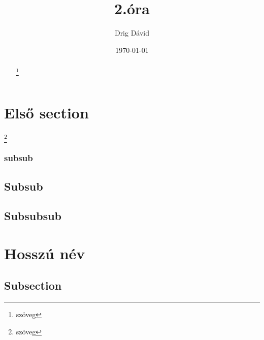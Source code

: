 \documentclass[12pt,twoside]{article}
\begin{document}
\pagestyle{fancy}
\setlength{\headheight}{52pt}


\renewcommand{\footrulewidth}{0.4pt}
\fancyhead[LE,RO]{\thepage}
\fancyhead[LO]{\leftmark}
\fancyhead[RE]{\rightmark}












\title{2.óra}
\author{Drig Dávid}
\date{\today}
\renewcommand{\thefootnote}{\fnsymbol{footnote}}
\maketitle



\begin{abstract}
\hulipsum[1]
\blindtext[1]
\footnote{szöveg}
\end{abstract}


\setcounter{tocdepth}{5} 
\tableofcontents
{}

\clearpage

\setcounter{secnumdepth}{5}

\section{Első section}\footnote{szöveg}
\subsubsection{subsub}

\subsection{Subsub}
\hulipsum
\subsection{Subsubsub}
\hulipsum

\section[Rövid név]{Hosszú név}
\subsection{Subsection}
\end{document}
